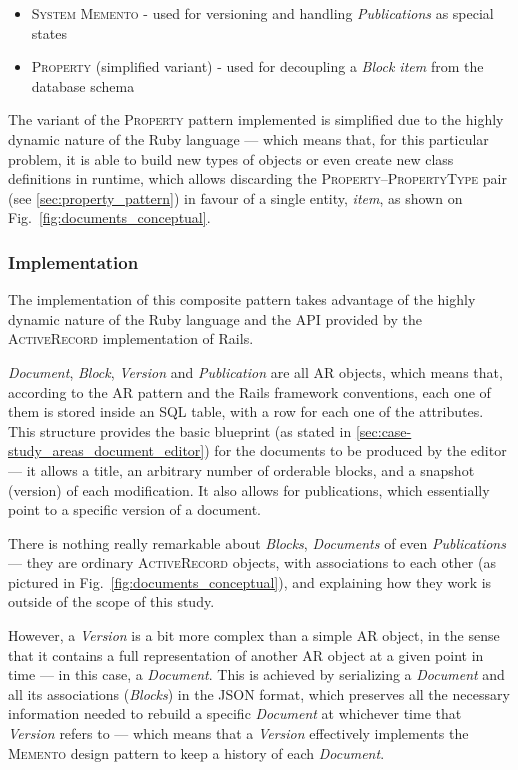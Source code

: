 \begin{itemize}
  \item \textsc{System Memento} - used for versioning and handling \emph{Publications} as special states
  \item \textsc{Property} (simplified variant) - used for decoupling a \emph{Block item} from the database schema
\end{itemize}

The variant of the \textsc{Property} pattern implemented is simplified due to the highly dynamic nature of the Ruby language --- which means that, for this particular problem, it is able to build new types of objects or even create new class definitions in runtime, which allows discarding the \textsc{Property}--\textsc{PropertyType} pair (see \ref{sec:property_pattern}) in favour of a single entity, \emph{item}, as shown on Fig.~\ref{fig:documents_conceptual}.

\subsubsection{Implementation}\label{sec:fa_documents_implementation}

The implementation of this composite pattern takes advantage of the highly dynamic nature of the Ruby language and the API provided by the \textsc{ActiveRecord} implementation of Rails.

\emph{Document}, \emph{Block}, \emph{Version} and \emph{Publication} are all AR objects, which means that, according to the AR pattern and the Rails framework conventions, each one of them is stored inside an SQL table, with a row for each one of the attributes. This structure provides the basic blueprint (as stated in \ref{sec:case-study_areas_document_editor}) for the documents to be produced by the editor --- it allows a title, an arbitrary number of orderable blocks, and a snapshot (version) of each modification. It also allows for publications, which essentially point to a specific version of a document.

There is nothing really remarkable about \emph{Blocks}, \emph{Documents} of even \emph{Publications} --- they are ordinary \textsc{ActiveRecord} objects, with associations to each other (as pictured in Fig.~\ref{fig:documents_conceptual}), and explaining how they work is outside of the scope of this study.

However, a \emph{Version} is a bit more complex than a simple AR object, in the sense that it contains a full representation of another AR object at a given point in time --- in this case, a \emph{Document}. This is achieved by serializing a \emph{Document} and all its associations (\emph{Blocks}) in the JSON format, which preserves all the necessary information needed to rebuild a specific \emph{Document} at whichever time that \emph{Version} refers to --- which means that a \emph{Version} effectively implements the \textsc{Memento} design pattern to keep a history of each \emph{Document}.

